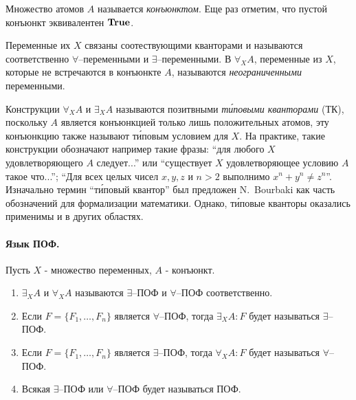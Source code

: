 \documentclass[a4paper]{jctart15b}
\begin{document}
Множество атомов $A$ называется {\em конъюнктом}. Еще раз отметим, что пустой конъюнкт эквивалентен $\text{\textbf{True}}$.

Переменные их $X$ связаны соотествующими кванторами и называются соответственно $\forall$--переменными и $\exists$--переменными. В $\forall_XA$, переменные из $X$, которые не встречаются в конъюнкте $A$, называются {\em неограниченными} переменными.


Конструкции $\forall_XA$ и $\exists_XA$ называются позитвными \emph{т\'иповыми кванторами} (ТК), поскольку $A$ является конъюнкцией только лишь положительных атомов, эту конъюнкцию также называют т\'иповым условием для $X$. На практике, такие конструкции  обозначают например такие фразы: ``для любого $X$ удовлетворяющего $A$ следует...'' или ``существует $X$ удовлетворяющее условию $A$ такое что...''; ``Для всех целых чисел $x,y,z$ и $n>2$ выполнимо $x^n + y^n \ne z^n$''. Изначально термин ``т\'иповый квантор'' был предложен N.~Bourbaki \cite{Bourbaki} как часть обозначений для формализации математики. Однако, т\'иповые кванторы оказались применимы и в других областях.

\paragraph{Язык ПОФ.}

\begin{definition}
\label{def:pcf}
Пусть $X$ - множество переменных, $A$ - конъюнкт.
\begin{enumerate}

\item $\exists_XA$ и $\forall_XA$ называются $\exists$--ПОФ и $\forall$--ПОФ соответственно.

\item Если $F = \{F_1,\ldots,F_n\}$ является $\forall$--ПОФ, тогда $\exists_XA\colon F$ будет называться $\exists$--ПОФ.

\item Если $F = \{F_1,\ldots,F_n\}$ является $\exists$--ПОФ, тогда $\forall_XA\colon F$ будет называться $\forall$--ПОФ.

\item Всякая $\exists$--ПОФ или $\forall$--ПОФ будет называться ПОФ.
\end{enumerate}
\end{definition}
\end{document}
